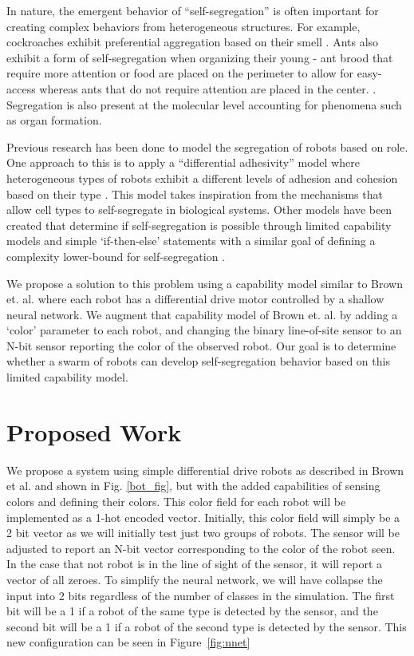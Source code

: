 \documentclass[conference]{IEEEtran}
\begin{document}
In nature, the emergent behavior of ``self-segregation'' is often important for creating complex behaviors from heterogeneous structures. 
For example, cockroaches exhibit preferential aggregation based on their smell \cite{c2}.
Ants also exhibit a form of self-segregation when organizing their young - ant brood that require more attention or food are placed on the perimeter to allow for easy-access whereas ants that do not require attention are placed in the center. \cite{c3}.
Segregation is also present at the molecular level accounting for phenomena such as organ formation. 

Previous research has been done to model the segregation of robots based on role. 
One approach to this is to apply a ``differential adhesivity'' model where heterogeneous types of robots exhibit a different levels of adhesion and cohesion based on their type \cite{c4}.
This model takes inspiration from the mechanisms that allow cell types to self-segregate in biological systems. 
Other models have been created that determine if self-segregation is possible through limited capability models and simple `if-then-else' statements with a similar goal of defining a complexity lower-bound for self-segregation \cite{c5}.

We propose a solution to this problem using a capability model similar to Brown et. al. where each robot has a differential drive motor controlled by a shallow neural network. 
We augment that capability model of Brown et. al. by adding a `color' parameter to each robot, and changing the binary line-of-site sensor to an N-bit sensor reporting the color of the observed robot. 
Our goal is to determine whether a swarm of robots can develop self-segregation behavior based on this limited capability model.


\section{Proposed Work}
We propose a system using simple differential drive robots as described in Brown et al. \cite{c1} and shown in Fig. \ref{bot_fig}, but with the added capabilities of sensing colors and defining their colors.
This color field for each robot will be implemented as a 1-hot encoded vector.
Initially, this color field will simply be a 2 bit vector as we will initially test just two groups of robots. 
The sensor will be adjusted to report an N-bit vector corresponding to the color of the robot seen. 
In the case that not robot is in the line of sight of the sensor, it will report a vector of all zeroes. 
To simplify the neural network, we will have collapse the input into 2 bits regardless of the number of classes in the simulation. 
The first bit will be a 1 if a robot of the same type is detected by the sensor, and the second bit will be a 1 if a robot of the second type is detected by the sensor. 
This new configuration can be seen in Figure~\ref{fig:nnet}
\end{document}
